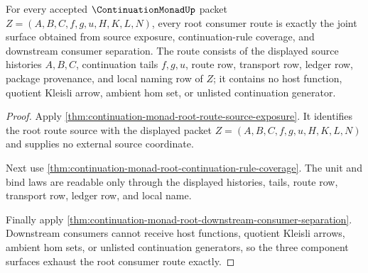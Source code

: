 \begin{theorem}
\label{thm:continuation-monad-root-source-triad-exactness}
For every accepted $\ContinuationMonadUp$ packet $Z=(A,B,C,f,g,u,H,K,L,N)$, every root consumer route is exactly the joint surface obtained from source exposure, continuation-rule coverage, and downstream consumer separation. The route consists of the displayed source histories $A,B,C$, continuation tails $f,g,u$, route row, transport row, ledger row, package provenance, and local naming row of $Z$; it contains no host function, quotient Kleisli arrow, ambient hom set, or unlisted continuation generator.
\end{theorem}
\begin{proof}
Apply \autoref{thm:continuation-monad-root-route-source-exposure}. It identifies the root route source with the displayed packet $Z=(A,B,C,f,g,u,H,K,L,N)$ and supplies no external source coordinate.

Next use \autoref{thm:continuation-monad-root-continuation-rule-coverage}. The unit and bind laws are readable only through the displayed histories, tails, route row, transport row, ledger row, and local name.

Finally apply \autoref{thm:continuation-monad-root-downstream-consumer-separation}. Downstream consumers cannot receive host functions, quotient Kleisli arrows, ambient hom sets, or unlisted continuation generators, so the three component surfaces exhaust the root consumer route exactly.
\end{proof}

